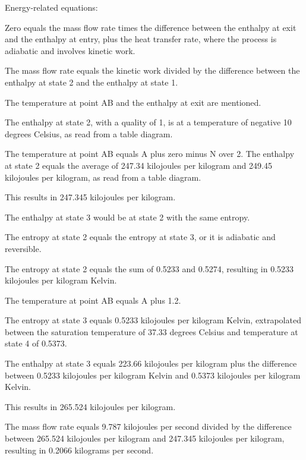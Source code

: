 Energy-related equations:

Zero equals the mass flow rate times the difference between the enthalpy at exit and the enthalpy at entry, plus the heat transfer rate, where the process is adiabatic and involves kinetic work.

The mass flow rate equals the kinetic work divided by the difference between the enthalpy at state 2 and the enthalpy at state 1.

The temperature at point AB and the enthalpy at exit are mentioned.

The enthalpy at state 2, with a quality of 1, is at a temperature of negative 10 degrees Celsius, as read from a table diagram.

The temperature at point AB equals A plus zero minus N over 2. The enthalpy at state 2 equals the average of 247.34 kilojoules per kilogram and 249.45 kilojoules per kilogram, as read from a table diagram.

This results in 247.345 kilojoules per kilogram.

The enthalpy at state 3 would be at state 2 with the same entropy.

The entropy at state 2 equals the entropy at state 3, or it is adiabatic and reversible.

The entropy at state 2 equals the sum of 0.5233 and 0.5274, resulting in 0.5233 kilojoules per kilogram Kelvin.

The temperature at point AB equals A plus 1.2.

The entropy at state 3 equals 0.5233 kilojoules per kilogram Kelvin, extrapolated between the saturation temperature of 37.33 degrees Celsius and temperature at state 4 of 0.5373.

The enthalpy at state 3 equals 223.66 kilojoules per kilogram plus the difference between 0.5233 kilojoules per kilogram Kelvin and 0.5373 kilojoules per kilogram Kelvin.

This results in 265.524 kilojoules per kilogram.

The mass flow rate equals 9.787 kilojoules per second divided by the difference between 265.524 kilojoules per kilogram and 247.345 kilojoules per kilogram, resulting in 0.2066 kilograms per second.